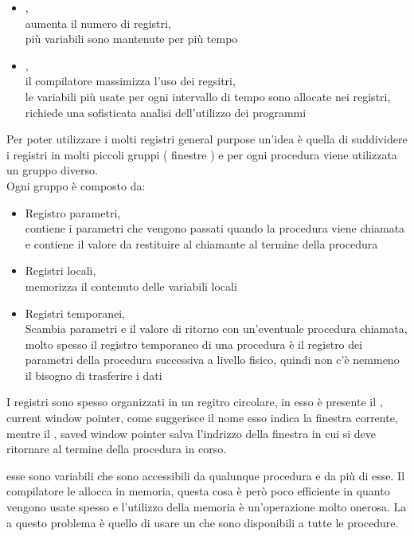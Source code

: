 \documentclass[arch.tex]{subfiles}
\begin{document}
\begin{itemize}
	\item {},\\
		aumenta il numero di registri,\\
		più variabili sono mantenute per più tempo
	\item {},\\
		il compilatore massimizza l'uso dei regsitri,\\
		le variabili più usate per ogni intervallo di tempo sono allocate nei registri,\\
		richiede una sofisticata analisi dell'utilizzo dei programmi
\end{itemize}
Per poter utilizzare i molti registri general purpose un'idea è quella di suddividere i registri
in molti piccoli gruppi ( finestre ) e per ogni procedura viene utilizzata un gruppo diverso.\\
Ogni gruppo è composto da:
\begin{itemize}
	\item Registro parametri,\\
		contiene i parametri che vengono passati quando la procedura viene chiamata
		e contiene il valore da restituire al chiamante al termine della procedura
	\item Registri locali,\\
		memorizza il contenuto delle variabili locali
	\item Registri temporanei,\\
		Scambia parametri e il valore di ritorno con un'eventuale procedura chiamata,\\
		molto spesso il registro temporaneo di una procedura  è il registro
		dei parametri della procedura successiva  a livello fisico, quindi
		non c'è nemmeno il bisogno di trasferire i dati
\end{itemize}

%
\label{par:buffer_circolare}

I registri sono spesso organizzati in un regitro circolare, in esso è presente il , 
current window pointer, come suggerisce il nome esso indica la finestra corrente,\\
mentre il , saved window pointer salva l'indrizzo della finestra in cui si deve 
ritornare al termine della procedura in corso.

%
\label{par:variabili_globali}

esse sono variabili che sono accessibili da qualunque procedura e da più di esse. Il compilatore
le allocca in memoria, questa cosa è però poco efficiente in quanto vengono usate spesso 
e l'utilizzo della memoria è un'operazione molto onerosa. La  a questo problema
è quello di usare un  che sono disponibili a tutte le procedure.
\end{document}

